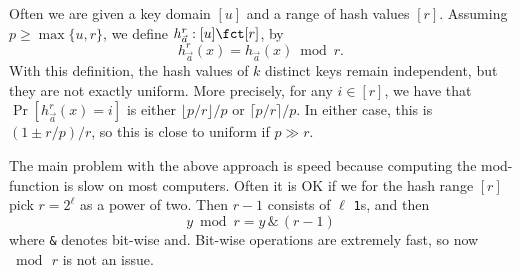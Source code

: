 Often we are given a key domain $[u]$ and a range of hash values $[r]$. Assuming $p\geq \max\{u,r\}$, we define
$h^r_{\vec a}:[u]\fct[r]$, by
\[h^r_{\vec a}(x)=h_{\vec a}(x)\bmod r.\]
With this definition, the hash values of $k$ distinct keys 
remain independent, but they are not exactly uniform. More
precisely, for any $i\in[r]$, we have that
$\Pr[h_{\vec a}^r(x)=i]$ is
either $\lfloor p/r\rfloor/p$ or $\lceil p/r\rceil/p$. In
either case, this is $(1\pm r/p)/r$, so this is close to uniform if
$p\gg r$.


The main problem with the above approach is speed because computing
the mod-function is slow on most computers. Often it
is OK if we for the hash range $[r]$ pick $r=2^\ell$ as a power of two.
Then $r-1$ consists of $\ell$ \texttt1s, and then 
\[y\bmod r=y\,\texttt\&\,(r-1)\]
where \texttt\& denotes bit-wise {\sc and}. Bit-wise operations are
extremely fast, so now $\bmod\,r$ is not an issue.

